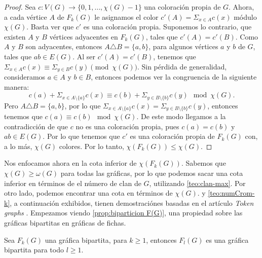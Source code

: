\begin{proof}
    Sea $c \colon V(G) \to \{0,1, \dots, \chi(G)-1\}$ una coloraci\'on propia de
    $G$. Ahora, a cada v\'ertice $A$ de $F_k(G)$ le asignamos el color $ c'(A)=
    \Sigma_{x \in A}c(x)$ m\'odulo $\chi(G)$. Basta ver que $c'$ es una
    coloraci\'on propia. Suponemos lo contrario, que existen $A$ y $B$
    v\'ertices adyacentes en $F_k(G)$, tales que $c'(A) = c'(B)$. Como $A$ y $B$
    son adyacentes, entonces $A \triangle B = \{a,b\}$, para algunos v\'ertices
    $a$ y $b$ de $G$, tales que $ab \in E(G)$. Al ser $c'(A) = c'(B)$, tenemos
    que $\Sigma_{x \in A}c(x) \equiv \Sigma_{y \in B}c(y) \pmod {\chi(G)}$. Sin
    p\'erdida de generalidad, consideramos $a \in A$ y $b \in B$, entonces
    podemos ver la congruencia de la siguiente manera:
    \[ c(a) + \Sigma_{x \in A \setminus\{a\}}c(x) \equiv c(b) + \Sigma_{y \in
    B\setminus\{b\}}c(y) \mod \chi(G).
    \] 
    Pero $A \triangle B = \{a,b\}$, por lo
    que $\Sigma_{x \in A\setminus\{a\}}c(x)=\Sigma_{y \in B\setminus\{b\}}c(y)$,
    entonces tenemos que $c(a) \equiv c(b) \mod \chi(G)$. De este modo llegamos
    a la contradicci\'on de que $c$ no es una coloraci\'on propia, pues $c(a) =
    c(b)$ y $ab \in E(G)$. Por lo que tenemos que $c'$ es una coloraci\'on
    propia de $F_k(G)$ con, a lo m\'as, $\chi (G)$ colores. Por lo tanto,
    $\chi(F_k(G)) \leq \chi (G)$.
\end{proof}

Nos enfocamos ahora en la cota inferior de $ \chi (F_k(G))$. Sabemos que $\chi
(G) \geq \omega (G)$ para todas las gr\'aficas, por lo que podemos sacar una
cota inferior en t\'erminos de el n\'umero de clan de $G$, utilizando
\cref{teo:clan-max}. Por otro lado, podemos encontrar una cota en t\'erminos de
$\chi (G)$.  y \cref{teo:numCrom-k}, a
continuaci\'on exhibidos, tienen demostraci\'ones basadas en el art\'iculo
\textit{Token graphs} \cite{fabilaToken}. Empezamos viendo
\cref{prop:biparticion F(G)}, una propiedad sobre las gr\'aficas bipartitas en
gr\'aficas de fichas.

\begin{proposicion}
\label{prop:biparticion F(G)}
    Sea $F_k(G)$ una gr\'afica bipartita, para $k \geq 1$, entonces $F_l(G)$ es
    una gr\'afica bipartita para todo $l \geq 1$.
\end{proposicion}

